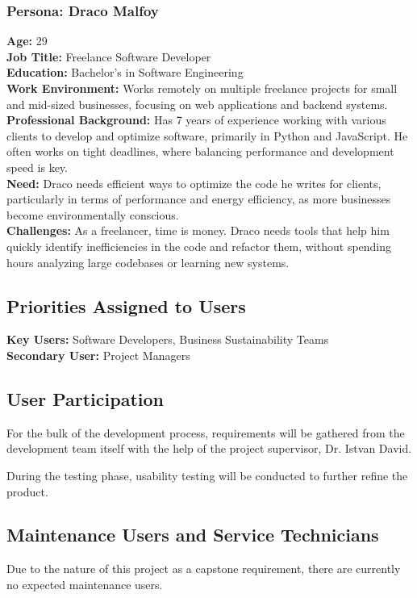 \documentclass[12pt]{article}
\begin{document}
\subsubsection*{Persona: Draco Malfoy}
\textbf{Age:} 29\\
\textbf{Job Title:} Freelance Software Developer\\
\textbf{Education:} Bachelor's in Software Engineering\\[2mm]
\textbf{Work Environment:} Works remotely on multiple freelance projects for small and mid-sized businesses, focusing on web applications and backend systems.\\
\textbf{Professional Background:} Has 7 years of experience working with various clients to develop and optimize software, primarily in Python and JavaScript. He often works on tight deadlines, where balancing performance and development speed is key.\\[2mm]
\textbf{Need:} Draco needs efficient ways to optimize the code he writes for clients, particularly in terms of performance and energy efficiency, as more businesses become environmentally conscious.\\
\textbf{Challenges:} As a freelancer, time is money. Draco needs tools that help him quickly identify inefficiencies in the code and refactor them, without spending hours analyzing large codebases or learning new systems.

\subsection{Priorities Assigned to Users}
\textbf{Key Users:} Software Developers, Business Sustainability Teams \\
\textbf{Secondary User:} Project Managers

\subsection{User Participation}
For the bulk of the development process, requirements will be gathered from the development team itself with the help of the project supervisor, Dr. Istvan David.

During the testing phase, usability testing will be conducted to further refine the product.

\subsection{Maintenance Users and Service Technicians}
Due to the nature of this project as a capstone requirement, there are currently no expected maintenance users.
\end{document}
